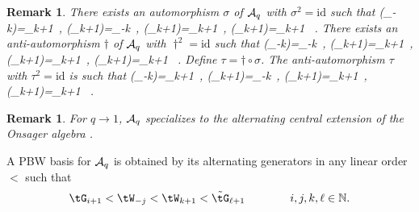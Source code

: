 \documentclass[11pt]{amsart}
\numberwithin{equation}{section}
\newtheorem{rem}[thm]{Remark}
\numberwithin{equation}{section}
\begin{document}
\begin{appendix}
	\begin{rem} \label{rem:auto}
		There exists an automorphism  $\sigma$ of ${\cal A}_q$ with $\sigma^2= \mathrm{id}$ such that \cite{BSh1}
	\beqa
		\sigma({\tW}_{-k})={\tW}_{k+1}\ , \quad \sigma({\tW}_{k+1})={\tW}_{-k}\ , \quad \sigma({\tG}_{k+1})=\tilde{\tG}_{k+1}\ , \quad \sigma(\tilde{\tG}_{k+1})={\tG}_{k+1} \ .\label{remomega}  
		\eeqa
		There exists an anti-automorphism  $\dagger$ of ${\cal A}_q$ with $\dagger^2= \mathrm{id}$ such that  \cite{Ter18}
		\beqa
		\dagger({\tW}_{-k})={\tW}_{-k}\ , \quad \dagger({\tW}_{k+1})={\tW}_{k+1}\ , \quad \dagger({\tG}_{k+1})=\tilde{\tG}_{k+1}\ , \quad \dagger(\tilde{\tG}_{k+1})={\tG}_{k+1} \ .\label{remdagger} 
		\eeqa
		 Define $\tau = \dagger \circ \sigma$. The anti-automorphism  $\tau$ with $\tau^2= \mathrm{id}$ is such that \cite{Ter21b}
		\beqa
		\tau({\tW}_{-k})={\tW}_{k+1}\ , \quad \tau({\tW}_{k+1})={\tW}_{-k}\ , \quad \tau({\tG}_{k+1})={\tG}_{k+1}\ , \quad \tau(\tilde{\tG}_{k+1})={\tilde\tG}_{k+1} \ .  \label{remtau}
		\eeqa
		\end{rem}
	
\begin{rem} For $q\rightarrow 1$, ${\cal A}_q$ specializes to the alternating central extension of the Onsager algebra \cite{Ter21e}. 
\end{rem}


A PBW basis for ${\cal A}_q$ is obtained by its alternating generators in any linear order $<$ such that	\cite[Thm.\,6.1]{Ter21}
%
	\begin{align}
		\tG_{i+1} < \tW_{-j} < \tW_{k+1} < \tilde{\tG}_{\ell+1}\qquad \qquad i,j,k, \ell \in \mathbb N.
		\label{eq:order}
	\end{align}


\end{appendix}
\end{document}

